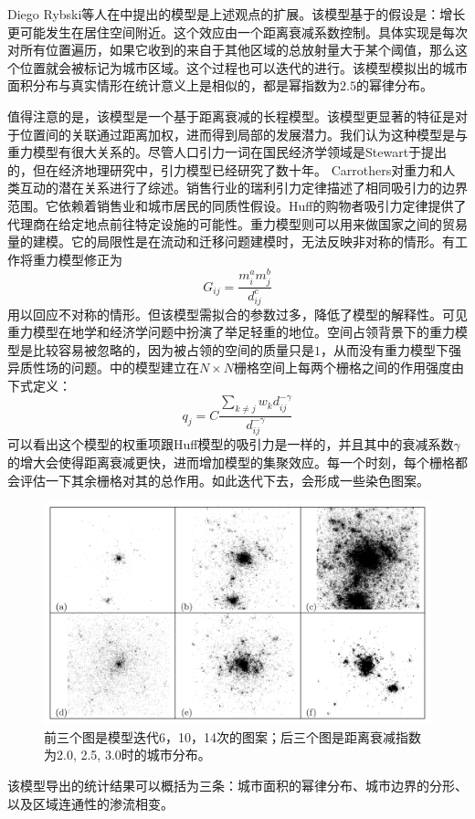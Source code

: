 Diego Rybski等人在\cite{PhysRevE.87.042114}中提出的模型是上述观点的扩展。该模型基于的假设是：增长更可能发生在居住空间附近。这个效应由一个距离衰减系数控制。具体实现是每次对所有位置遍历，如果它收到的来自于其他区域的总放射量大于某个阈值，那么这个位置就会被标记为城市区域。这个过程也可以迭代的进行。该模型模拟出的城市面积分布与真实情形在统计意义上是相似的，都是幂指数为$2.5$的幂律分布。

值得注意的是，该模型是一个基于距离衰减的长程模型。该模型更显著的特征是对于位置间的关联通过距离加权，进而得到局部的发展潜力。我们认为这种模型是与重力模型有很大关系的。尽管人口引力一词在国民经济学领域是Stewart于\cite{10.2307/2785468}提出的，但在经济地理研究中，引力模型已经研究了数十年。 Carrothers\cite{carrothers1956historical}对重力和人类互动的潜在关系进行了综述。销售行业的瑞利引力定律描述了相同吸引力的边界范围\cite{reilly1931law}。它依赖着销售业和城市居民的同质性假设。Huff的购物者吸引力定律\cite{10.2307/3144521}提供了代理商在给定地点前往特定设施的可能性。重力模型则可以用来做国家之间的贸易量的建模。它的局限性是在流动和迁移问题建模时，无法反映非对称的情形。有工作将重力模型修正为\[G_{ij} = \frac{m_i^am_j^b}{d_{ij}^c}\]用以回应不对称的情形。但该模型需拟合的参数过多，降低了模型的解释性。可见重力模型在地学和经济学问题中扮演了举足轻重的地位。空间占领背景下的重力模型是比较容易被忽略的，因为被占领的空间的质量只是$1$，从而没有重力模型下强异质性场的问题。\cite{PhysRevE.87.042114}中的模型建立在$N\times N$栅格空间上每两个栅格之间的作用强度由下式定义：\[q_j = C\frac{\sum_{k\ne j}w_k d_{ij}^{-\gamma}}{d_{ij}^{-\gamma}}\]可以看出这个模型的权重项跟Huff模型的吸引力是一样的，并且其中的衰减系数$\gamma$的增大会使得距离衰减更快，进而增加模型的集聚效应。每一个时刻，每个栅格都会评估一下其余栅格对其的总作用。如此迭代下去，会形成一些染色图案。\begin{figure}
    \centering
    \includegraphics[width=\textwidth]{pictures/distance-weighted.png}
    \caption{前三个图是模型迭代6，10，14次的图案；后三个图是距离衰减指数为2.0, 2.5, 3.0时的城市分布。}
\end{figure}
该模型导出的统计结果可以概括为三条：城市面积的幂律分布、城市边界的分形、以及区域连通性的渗流相变。

